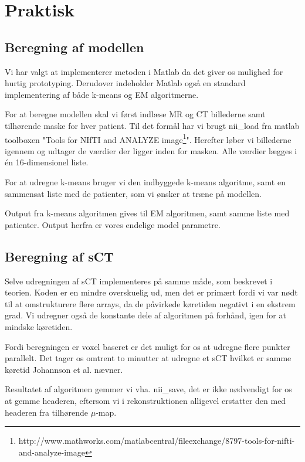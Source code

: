 \section{Praktisk}

\subsection{Beregning af modellen}

Vi har valgt at implementerer metoden i Matlab da det giver os mulighed
for hurtig prototyping. Derudover indeholder Matlab også en standard
implementering af både k-means og EM algoritmerne.

For at beregne modellen skal vi først indlæse MR og CT billederne
samt tilhørende maske for hver patient. Til det formål har vi brugt
nii\_load fra mat\-lab toolboxen "Tools for NIfTI and ANALYZE
image\footnote{http://www.mathworks.com/matlabcentral/fileexchange/8797-tools-for-nifti-and-analyze-image}".
Herefter løber vi billederne igennem og udtager de værdier der ligger
inden for masken. Alle værdier lægges i én 16-dimensionel liste.

For at udregne k-means bruger vi den indbyggede k-means algoritme, samt
en sammensat liste med de patienter, som vi ønsker at træne på
modellen.

Output fra k-means algoritmen gives til EM algoritmen, samt samme liste
med patienter. Output herfra er vores endelige model parametre.

\subsection{Beregning af sCT}

Selve udregningen af sCT implementeres på samme måde, som beskrevet i
teorien. Koden er en mindre overskuelig ud, men det er primært fordi
vi var nødt til at omstrukturere flere arrays, da de påvirkede
køretiden negativt i en ekstrem grad. Vi udregner også de konstante dele
af algoritmen på forhånd, igen for at mindske køretiden.

Fordi beregningen er voxel baseret er det muligt for os at udregne flere
punkter parallelt. Det tager os omtrent to minutter at udregne et sCT
hvilket er samme køretid Johannson et al. nævner.

Resultatet af algoritmen gemmer vi vha. nii\_save, det er ikke
nødvendigt for os at gemme headeren, eftersom vi i rekonstruktionen
alligevel erstatter den med headeren fra tilhørende $\mu$-map.


